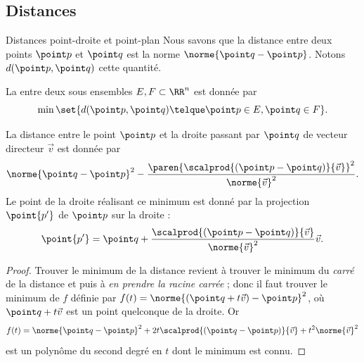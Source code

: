 \documentclass[french,xcolor=svgnames]{beamer}
\begin{document}
  \subsection{Distances}
\begin{frame}{Distances point-droite et point-plan}
\label{sec:distances}
Nous savons que la distance entre deux points \(\point p\) et \(\point q\) est la norme \(\norme{\point q - \point p}\). Notons \(d(\point p, \point q)\) cette quantité.

\begin{definition}
  La  entre deux sous ensembles \(E,F\subset \RR^{n}\) est donnée par
  \begin{equation*}
    \min \set{ d(\point p, \point q) \telque \point p\in E, \point q \in F}.
  \end{equation*}
\end{definition}

\end{frame}
\begin{frame}
\begin{proposition}
  La distance entre le point \(\point p\) et la droite passant par \(\point q\) de vecteur directeur \(\vec v\) est donnée par
  \begin{equation*}
    \norme{\point q - \point p}^{2} -  \frac{\paren{\scalprod{(\point p - \point q)}{\vec v}}^{2}}{\norme{\vec v}^{2}}.
  \end{equation*}\pause
  Le point de la droite réalisant ce minimum est donné par la projection \(\point {p'}\) de \(\point p\) sur la droite :
  \begin{equation*}
    \point {p'} = \point q + \frac{\scalprod{(\point p - \point q)}{\vec v}}{\norme{\vec v}^{2}} \vec v.
  \end{equation*}
\end{proposition}
\begin{proof}
 Trouver le minimum de la distance revient à trouver le minimum du \emph{carré} de la distance et puis à \emph{en prendre la racine carrée} ; donc il faut trouver le minimum de \(f\) définie par \(f(t) = \norme{(\point q + t \vec v) - \point p}^{2}\), où \(\point q + t \vec v\) est un point quelconque de la droite. Or
  \begin{equation*}
    f(t) = \norme{\point q - \point p}^{2} + 2 t \scalprod{(\point q - \point p)}{\vec v} + t^{2} \norme{\vec v}^{2}
  \end{equation*}
  est un polynôme du second degré en \(t\) dont le minimum est connu.%
\end{proof}
\end{frame}
\end{document}
